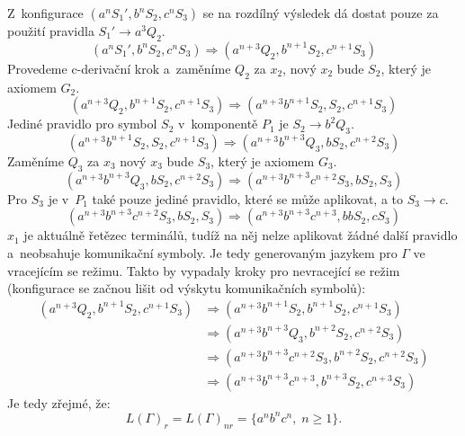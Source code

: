 \begin{example}
    Z~konfigurace $(a^nS_1', b^nS_2, c^nS_3)$ se na rozdílný výsledek dá dostat pouze za použití pravidla $S_1' \rightarrow a^3Q_2$.
    \begin{equation*}
        (a^nS_1', b^nS_2, c^nS_3) \Rightarrow (a^{n+3}Q_2, b^{n+1}S_2, c^{n+1}S_3)
    \end{equation*} 
    Provedeme c-derivační krok a~zaměníme $Q_2$ za $x_2$, nový $x_2$ bude $S_2$, který je axiomem $G_2$.
    \begin{equation*}
        (a^{n+3}Q_2, b^{n+1}S_2, c^{n+1}S_3) \Rightarrow (a^{n+3}b^{n+1}S_2, S_2, c^{n+1}S_3)
    \end{equation*}
    Jediné pravidlo pro symbol $S_2$ v~komponentě $P_1$ je $S_2 \rightarrow b^2Q_3$.
    \begin{equation*}
        (a^{n+3}b^{n+1}S_2, S_2, c^{n+1}S_3) \Rightarrow (a^{n+3}b^{n+3}Q_3, bS_2, c^{n+2}S_3)
    \end{equation*}
    Zaměníme $Q_3$ za $x_3$ nový $x_3$ bude $S_3$, který je axiomem $G_3$.
    \begin{equation*}
        (a^{n+3}b^{n+3}Q_3, bS_2, c^{n+2}S_3) \Rightarrow (a^{n+3}b^{n+3}c^{n+2}S_3, bS_2, S_3)
    \end{equation*}
    Pro $S_3$ je v~$P_1$ také pouze jediné pravidlo, které se může aplikovat, a to $S_3 \rightarrow c$.
    \begin{equation*}
        (a^{n+3}b^{n+3}c^{n+2}S_3, bS_2, S_3) \Rightarrow (a^{n+3}b^{n+3}c^{n+3}, bbS_2, cS_3)
    \end{equation*}
     $x_1$ je aktuálně řetězec terminálů, tudíž na něj nelze aplikovat žádné další pravidlo a~neobsahuje komunikační symboly.
     Je tedy generovaným jazykem pro $\Gamma$ ve vracejícím se režimu.
     Takto by vypadaly kroky pro nevracející se režim (konfigurace se začnou lišit od výskytu komunikačních symbolů):
     \begin{align*}
        (a^{n+3}Q_2, b^{n+1}S_2, c^{n+1}S_3) &\Rightarrow (a^{n+3}b^{n+1}S_2, b^{n+1}S_2, c^{n+1}S_3) \\
        &\Rightarrow (a^{n+3}b^{n+3}Q_3, b^{n+2}S_2, c^{n+2}S_3) \\
        &\Rightarrow (a^{n+3}b^{n+3}c^{n+2}S_3, b^{n+2}S_2, c^{n+2}S_3) \\
        &\Rightarrow (a^{n+3}b^{n+3}c^{n+3}, b^{n+3}S_2, c^{n+3}S_3)
     \end{align*}
     Je tedy zřejmé, že:
     \begin{equation*}
        L(\Gamma)_r = L(\Gamma)_{nr} = \{a^nb^nc^n,\; n \geq 1\}.
     \end{equation*}
\end{example}


